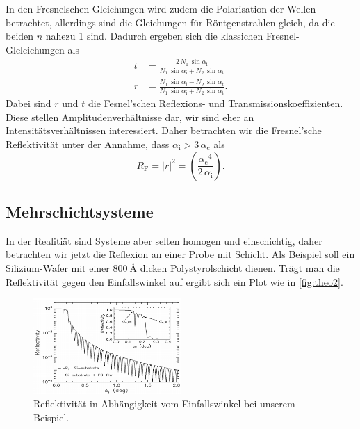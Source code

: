 In den Fresnelschen Gleichungen wird zudem die Polarisation der Wellen betrachtet, allerdings sind die Gleichungen für Röntgenstrahlen gleich, da die beiden $n$ nahezu 1 sind.
Dadurch ergeben sich die klassichen Fresnel-Gleleichungen als
\begin{align}
    t &= \frac{2 \, N_1 \, \sin{\alpha _\text{i}} }{N_1 \, \sin{\alpha _\text{i}} + N_2 \, \sin{\alpha _\text{t}}} \\
    r &= \frac{N_1 \, \sin{\alpha _\text{i}} - N_2 \, \sin{\alpha _\text{t}}}{N_1 \, \sin{\alpha _\text{i}} + N_2 \, \sin{\alpha _\text{t}}}.
\end{align}
Dabei sind $r$ und $t$ die Fesnel'schen Reflexions- und Transmissionskoeffizienten. 
Diese stellen Amplitudenverhältnisse dar, wir sind eher an Intensitätsverhältnissen interessiert.
Daher betrachten wir die Fresnel'sche Reflektivität unter der Annahme, dass $\alpha _\text{i} > 3 \, \alpha _\text{c}$ als 
\begin{equation}
    R_\text{F} = |r|^2 = \left( \frac{{\alpha _\text{c}}^4}{2 \, \alpha _\text{i}}  \right).
    \label{eq:reflek}
\end{equation}

\subsection{Mehrschichtsysteme}
\label{theo2}

In der Realitiät sind Systeme aber selten homogen und einschichtig, daher betrachten wir jetzt die Reflexion an einer Probe mit Schicht.
Als Beispiel soll ein Silizium-Wafer mit einer $\SI{800}{\angstrom}$ dicken Polystyrolschicht dienen. 
Trägt man die Reflektivität gegen den Einfallswinkel auf ergibt sich ein Plot wie in \autoref{fig:theo2}.

\begin{figure}
    \centering
    \includegraphics[width=0.5\textwidth]{images/plot.png}
    \caption{Reflektivität in Abhängigkeit vom Einfallswinkel bei unserem Beispiel. \cite{V44-old}}
    \label{fig:theo2}
\end{figure}

